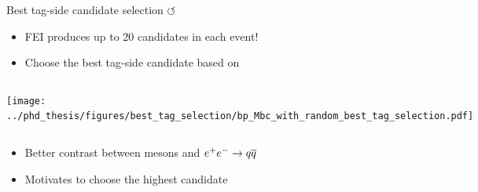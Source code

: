 \documentclass[xcolor=dvipsnames]{beamer}
\begin{document}
\begin{frame}{Best tag-side candidate selection \hyperlink{frame:A}{$\circlearrowleft$}}
   \scriptsize\centering
      \begin{itemize}
         \item    FEI produces up to 20 candidates in each event!
         \item[\ra] Choose the best tag-side candidate based on \feiProb
      \end{itemize}
   
   \begin{columns}
      \centering
      \texttt{[image: ../phd\_thesis/figures/best\_tag\_selection/bp\_Mbc\_with\_random\_best\_tag\_selection.pdf]}
      \centering
   
   \end{columns}
   
   \begin{itemize}
      \item[\ra] Better contrast between \B mesons and $e^+e^-\rightarrow q\overline q$
      \item Motivates to choose the highest \feiProb candidate
   \end{itemize}
   
   \end{frame}
\end{document}
